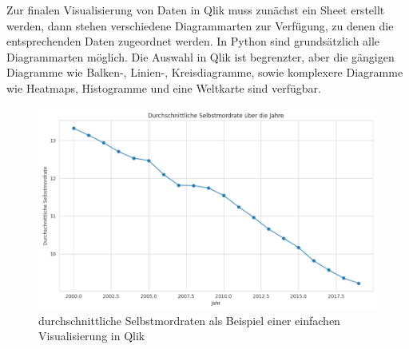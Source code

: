 \documentclass[12pt]{article}
\begin{document}
	Zur finalen Visualisierung von Daten in Qlik muss zunächst ein Sheet erstellt werden, dann stehen verschiedene Diagrammarten zur Verfügung, zu denen die entsprechenden Daten zugeordnet werden.
	In Python sind grundsätzlich alle Diagrammarten möglich. Die Auswahl in Qlik ist begrenzter, aber die gängigen Diagramme wie Balken-, Linien-, Kreisdiagramme, sowie komplexere Diagramme wie Heatmaps, Histogramme und eine Weltkarte sind verfügbar. 
	\begin{figure}[h]
		\centering
		\includegraphics[width=1.0\textwidth]{easy_linechart}
		\caption{durchschnittliche Selbstmordraten als Beispiel einer einfachen Visualisierung in Qlik}
	\end{figure}
	
\end{document}
